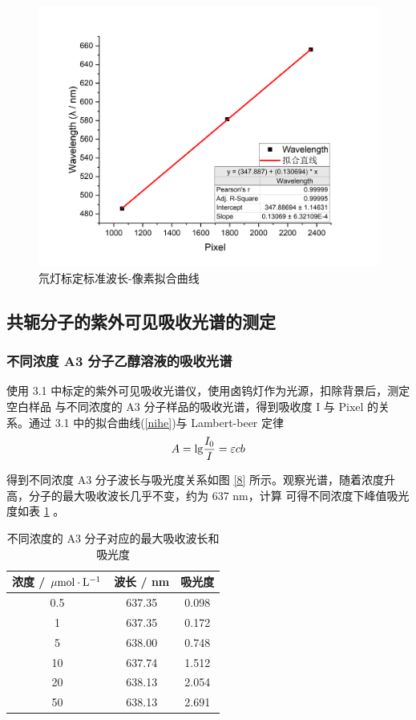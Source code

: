 \documentclass[cn,hazy,pku,12pt,normal,math=newtx,cite=super]{elegantnote}
\begin{document}
\begin{figure}[htbp]
    \centering
    \includegraphics[width = .70\textwidth]{image/biaodingzhixian.png}
    \caption{氘灯标定标准波长-像素拟合曲线}\label{7}
\end{figure}

\newpage


\subsection{共轭分子的紫外可见吸收光谱的测定}

\subsubsection{不同浓度 A3 分子乙醇溶液的吸收光谱}

使用 3.1 中标定的紫外可见吸收光谱仪，使用卤钨灯作为光源，扣除背景后，测定空白样品
与不同浓度的 A3 分子样品的吸收光谱，得到吸收度 I 与 Pixel 的关系。通过 3.1 中的拟合曲线(\ref{nihe})与 Lambert-beer 定律
\begin{equation}\label{xgd}
    A={\rm lg}\frac{I_0}{I}=\varepsilon cb
\end{equation}

得到不同浓度 A3 分子波长与吸光度关系如图 \ref{8} 所示。观察光谱，随着浓度升高，分子的最大吸收波长几乎不变，约为 637 nm，计算
可得不同浓度下峰值吸光度如表 \ref{9} 。
\begin{table}[htbp]
    \centering
    \caption{不同浓度的 A3 分子对应的最大吸收波长和吸光度}\label{9}
    \begin{tabular}{ccc}
    \hline
    \multicolumn{1}{l}{浓度 / $ \mu {\rm mol \cdot  L^{-1}}$}  & 波长 / nm  & 吸光度     \\ \hline
    0.5               & 637.35 & 0.098 \\
    1                 & 637.35 & 0.172 \\
    5                 & 638.00 & 0.748 \\
    10                & 637.74 & 1.512 \\
    20                & 638.13 & 2.054 \\
    50                & 638.13 & 2.691 \\ \hline
    \end{tabular}
\end{table}
\end{document}
